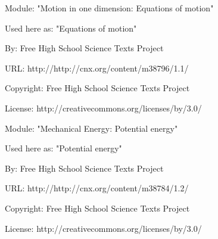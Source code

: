       \par\vspace{9pt}\noindent\begin{minipage}{\textwidth}
      Module: "Motion in one dimension: Equations of motion" \par\nopagebreak\noindent
      Used here as: "Equations of motion" \par\nopagebreak\noindent
        By: Free High School Science Texts Project\par\nopagebreak\noindent
      URL: http://http://cnx.org/content/m38796/1.1/\par\nopagebreak\noindent
      \par\nopagebreak\noindent
      Copyright: Free High School Science Texts Project\par\nopagebreak\noindent
      License:  http://creativecommons.org/licenses/by/3.0/\par\nopagebreak\noindent
      \par\end{minipage}
      \par\vspace{9pt}\noindent\begin{minipage}{\textwidth}
      Module: "Mechanical Energy: Potential energy" \par\nopagebreak\noindent
      Used here as: "Potential energy" \par\nopagebreak\noindent
        By: Free High School Science Texts Project\par\nopagebreak\noindent
      URL: http://http://cnx.org/content/m38784/1.2/\par\nopagebreak\noindent
      \par\nopagebreak\noindent
      Copyright: Free High School Science Texts Project\par\nopagebreak\noindent
      License:  http://creativecommons.org/licenses/by/3.0/\par\nopagebreak\noindent
      \par\end{minipage}
